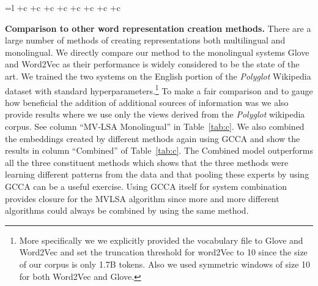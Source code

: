 \documentclass[11pt]{article}
\makeatletter
\newcommand{\remove}[1]{}
\newcommand*{\@rowstyle}{}
\newcommand*{\rowstyle}[1]{%
  \gdef\@rowstyle{#1}%
  \@rowstyle\ignorespaces%
}
\makeatother
\begin{document}
\begin{table*}[htbp]
{\begin{tabular}{=l +c +c +c +c +c +c +c +c}
\remove{
\rowstyle{\color{darkergray}}TOEFL    & 82.5     &  82.5    &   82.5       &  71.2   &   45.0       & 85.0     &    82.5   &    65.0    
}
  \end{tabular}
  }
  \parbox{\textwidth}{\caption{Performance versus views removed from
      the multiview GCCA procedure. !Framenet means that the view
      containing counts derived from Frame semantic dataset was
      removed. Other columns are named similarly. The other
      hyperparameters were $n_j=\textrm{Count}^{\frac{1}{4}}, \;
      m=300, \; t=100K, \; v=25$. }}
  \label{tab:vj}
\end{table*}


\textbf{Comparison to other word representation creation methods.}
There are a large number of methods of creating representations both
multilingual and monolingual. We directly compare our method to the
monolingual systems Glove and Word2Vec as their performance is widely
considered to be the state of the art.
We trained the two systems on the English portion of the
\textit{Polyglot} Wikipedia dataset with standard hyperparameters.\footnote{More specifically we
we explicitly provided the vocabulary file to Glove and Word2Vec and set the
truncation threshold for word2Vec to 10 since the size of our corpus is only
1.7B tokens. Also we used symmetric windows of size 10 for both
Word2Vec and Glove.}
To make a fair comparison and to gauge how beneficial the addition of
additional sources of information was we also provide 
results where we use only the views derived from the \textit{Polyglot}
wikipedia corpus. See column ``MV-LSA Monolingual'' in Table~\ref{tab:c}. 
We also combined the embeddings created by different methods again using GCCA and show the
results in column ``Combined'' of Table~\ref{tab:c}. The Combined
model outperforms all the three constituent methods which shows that
the three methods were learning different patterns from the
data and that pooling these experts by using GCCA can be a useful
exercise. Using GCCA itself for system combination provides closure
for the MVLSA algorithm since more and more different algorithms could
always be combined by using the same method. 
\end{document}
